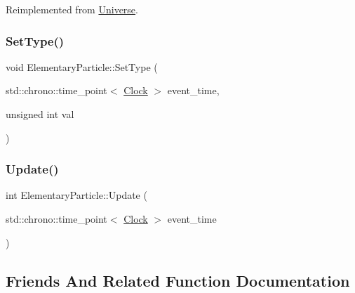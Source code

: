 Reimplemented from \mbox{\hyperlink{classUniverse_ae2ae1c3b3e4cde2c18f5f6a814761ec8}{Universe}}.

\mbox{\label{classElementaryParticle_a37d7718faf6be68d4374bcc56816f30a}} 
\subsubsection{\texorpdfstring{Set\+Type()}{SetType()}}
{\footnotesize\ttfamily void Elementary\+Particle\+::\+Set\+Type (\begin{DoxyParamCaption}\item[{std\+::chrono\+::time\+\_\+point$<$ \mbox{\hyperlink{universe_8h_a0ef8d951d1ca5ab3cfaf7ab4c7a6fd80}{Clock}} $>$}]{event\+\_\+time,  }\item[{unsigned int}]{val }\end{DoxyParamCaption})\hspace{0.3cm}{\ttfamily [inline]}}

\mbox{\label{classElementaryParticle_abf5114c3d032bc9511a14aa7368ec450}} 
\subsubsection{\texorpdfstring{Update()}{Update()}}
{\footnotesize\ttfamily int Elementary\+Particle\+::\+Update (\begin{DoxyParamCaption}\item[{std\+::chrono\+::time\+\_\+point$<$ \mbox{\hyperlink{universe_8h_a0ef8d951d1ca5ab3cfaf7ab4c7a6fd80}{Clock}} $>$}]{event\+\_\+time }\end{DoxyParamCaption})}



\subsection{Friends And Related Function Documentation}
\mbox{\label{classElementaryParticle_a9bc6eb2a4c20ce83728a7c9a31b91f19}} 
